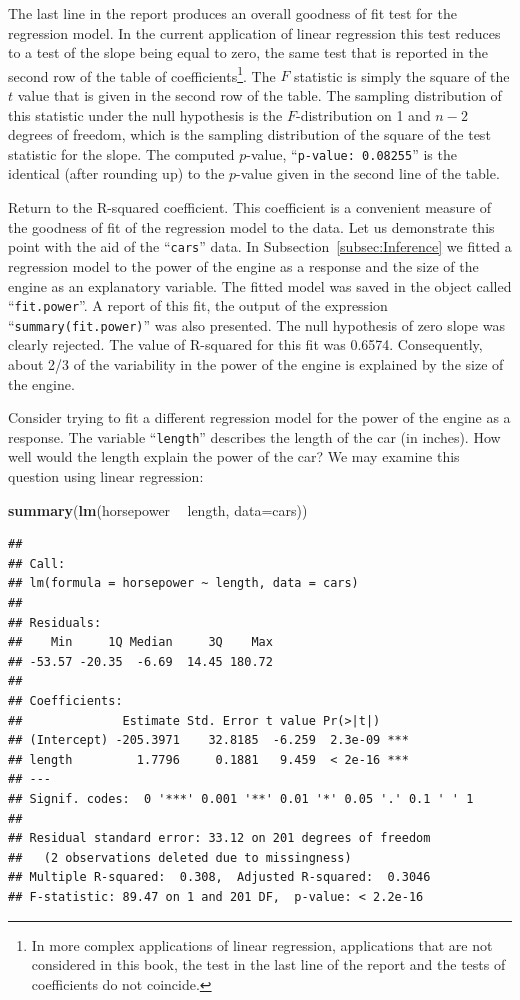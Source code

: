 \documentclass[
]{krantz}
\makeatletter
\newenvironment{Shaded}{\begin{snugshade}}{\end{snugshade}}
\newcommand{\DataTypeTok}[1]{\textcolor[rgb]{0.13,0.29,0.53}{#1}}
\newcommand{\KeywordTok}[1]{\textcolor[rgb]{0.13,0.29,0.53}{\textbf{#1}}}
\newcommand{\NormalTok}[1]{#1}
\newcommand{\OperatorTok}[1]{\textcolor[rgb]{0.81,0.36,0.00}{\textbf{#1}}}
\newcommand{\StringTok}[1]{\textcolor[rgb]{0.31,0.60,0.02}{#1}}
\newenvironment{kframe}{%
\medskip{}
\setlength{\fboxsep}{.8em}
 \def\at@end@of@kframe{}%
 \ifinner\ifhmode%
  \def\at@end@of@kframe{\end{minipage}}%
  \begin{minipage}{\columnwidth}%
 \fi\fi%
 \def\FrameCommand##1{\hskip\@totalleftmargin \hskip-\fboxsep
 \colorbox{shadecolor}{##1}\hskip-\fboxsep
     \hskip-\linewidth \hskip-\@totalleftmargin \hskip\columnwidth}%
 \MakeFramed {\advance\hsize-\width
   \@totalleftmargin\z@ \linewidth\hsize
   \@setminipage}}%
 {\par\unskip\endMakeFramed%
 \at@end@of@kframe}
\renewenvironment{Shaded}{\begin{kframe}}{\end{kframe}}
\theoremstyle{definition}
\theoremstyle{definition}
\theoremstyle{definition}
\theoremstyle{remark}
\makeatother
\begin{document}
The last line in the report produces an overall goodness of fit test for
the regression model. In the current application of linear regression
this test reduces to a test of the slope being equal to zero, the same
test that is reported in the second row of the table of
coefficients\footnote{In more complex applications of linear regression, applications
  that are not considered in this book, the test in the last line of
  the report and the tests of coefficients do not coincide.}. The \(F\) statistic is simply the square of the \(t\)
value that is given in the second row of the table. The sampling
distribution of this statistic under the null hypothesis is the
\(F\)-distribution on 1 and \(n-2\) degrees of freedom, which is the
sampling distribution of the square of the test statistic for the slope.
The computed \(p\)-value, ``\texttt{p-value:\ 0.08255}'' is the identical (after
rounding up) to the \(p\)-value given in the second line of the table.

Return to the R-squared coefficient. This coefficient is a convenient
measure of the goodness of fit of the regression model to the data. Let
us demonstrate this point with the aid of the ``\texttt{cars}'' data. In
Subsection~\ref{subsec:Inference} we fitted a regression model to
the power of the engine as a response and the size of the engine as an
explanatory variable. The fitted model was saved in the object called
``\texttt{fit.power}''. A report of this fit, the output of the expression
``\texttt{summary(fit.power)}'' was also presented. The null hypothesis of zero
slope was clearly rejected. The value of R-squared for this fit was
0.6574. Consequently, about 2/3 of the variability in the power of the
engine is explained by the size of the engine.

Consider trying to fit a different regression model for the power of the
engine as a response. The variable ``\texttt{length}'' describes the length of
the car (in inches). How well would the length explain the power of the
car? We may examine this question using linear regression:

\begin{Shaded}
\begin{Highlighting}[]
\KeywordTok{summary}\NormalTok{(}\KeywordTok{lm}\NormalTok{(horsepower }\OperatorTok{~}\StringTok{ }\NormalTok{length, }\DataTypeTok{data=}\NormalTok{cars))}
\end{Highlighting}
\end{Shaded}

\begin{verbatim}
## 
## Call:
## lm(formula = horsepower ~ length, data = cars)
## 
## Residuals:
##    Min     1Q Median     3Q    Max 
## -53.57 -20.35  -6.69  14.45 180.72 
## 
## Coefficients:
##              Estimate Std. Error t value Pr(>|t|)    
## (Intercept) -205.3971    32.8185  -6.259  2.3e-09 ***
## length         1.7796     0.1881   9.459  < 2e-16 ***
## ---
## Signif. codes:  0 '***' 0.001 '**' 0.01 '*' 0.05 '.' 0.1 ' ' 1
## 
## Residual standard error: 33.12 on 201 degrees of freedom
##   (2 observations deleted due to missingness)
## Multiple R-squared:  0.308,  Adjusted R-squared:  0.3046 
## F-statistic: 89.47 on 1 and 201 DF,  p-value: < 2.2e-16
\end{verbatim}
\end{document}
